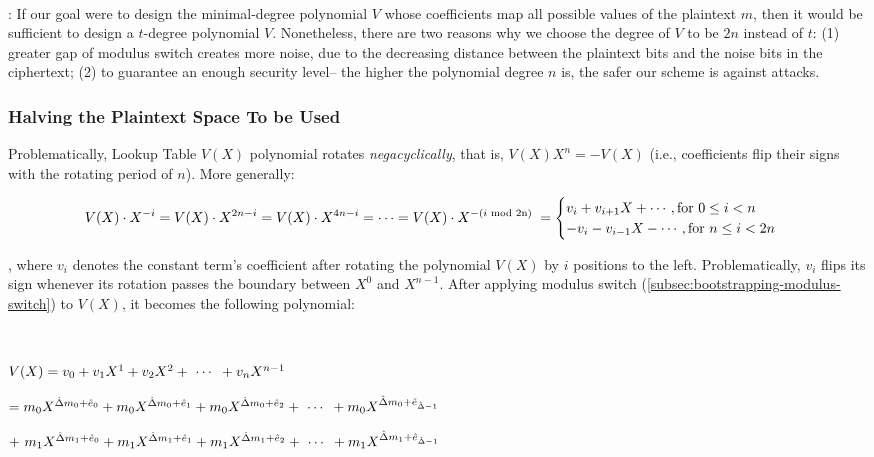 $ $

: If our goal were to design the minimal-degree polynomial $V$ whose coefficients map all possible values of the plaintext $m$, then it would be sufficient to design a ${t}$-degree polynomial $V$. Nonetheless, there are two reasons why we choose the degree of $V$ to be $2n$ instead of ${t}$: (1) greater gap of modulus switch creates more noise, due to the decreasing distance between the plaintext bits and the noise bits in the ciphertext; (2) to guarantee an enough security level-- the higher the polynomial degree $n$ is, the safer our scheme is against attacks. 



\subsubsection{Halving the Plaintext Space To be Used}
\label{subsec:tfhe-zero-padding} 

Problematically, Lookup Table $V(X)$ polynomial rotates \textit{negacyclically}, that is, $V(X)X^{n} = -V(X)$ (i.e., coefficients flip their signs with the rotating period of $n$). More generally:

\begin{figure}[h]
\[
    V(X)\cdot X^{-i}= V(X)\cdot X^{2n - i} = V(X)\cdot X^{4n - i} = \cdots = V(X)\cdot X^{-(i \text{ } \text{\text{mod} 2n)} \text{ }} =  
\begin{cases}
    v_i  + v_{i+1}X + \cdots, \text{for } 0\leq i<n\\
    -v_{i} - v_{i-1}X - \cdots, \text{for } n\leq i<2n
\end{cases}
\]
\end{figure}

\noindent , where $v_i$ denotes the constant term's coefficient after rotating the polynomial $V(X)$ by $i$ positions to the left. Problematically, $v_i$ flips its sign whenever its rotation passes the boundary between $X^0$ and $X^{n-1}$. After applying modulus switch (\autoref{subsec:bootstrapping-modulus-switch}) to $V(X)$, it becomes the following polynomial:

$ $

$V(X) = v_0 + v_1X^1 + v_2X^2 + \text{ } \text{$\cdots$} \text{ } + v_nX^{n-1}$

\text{ } $= m_0X^{\hat{\Delta} m_0 + \hat{e}_0} + m_0X^{\hat{\Delta} m_0 + \hat{e}_1} + m_0X^{\hat{\Delta} m_0 + \hat{e}_2} + \text{ } \text{$\cdots$} \text{ } +  m_0X^{\hat{\Delta} m_0 + \hat{e}_{\hat{\Delta} - 1}}$

\text{ } $ + \text{ } m_1X^{\hat{\Delta} m_1 + \hat{e}_0} + m_1X^{\hat{\Delta} m_1 + \hat{e}_1} + m_1X^{\hat{\Delta} m_1 + \hat{e}_2} + \text{ } \text{$\cdots$} \text{ } + m_1X^{\hat{\Delta} m_1 + \hat{e}_{\hat{\Delta} - 1}}$

